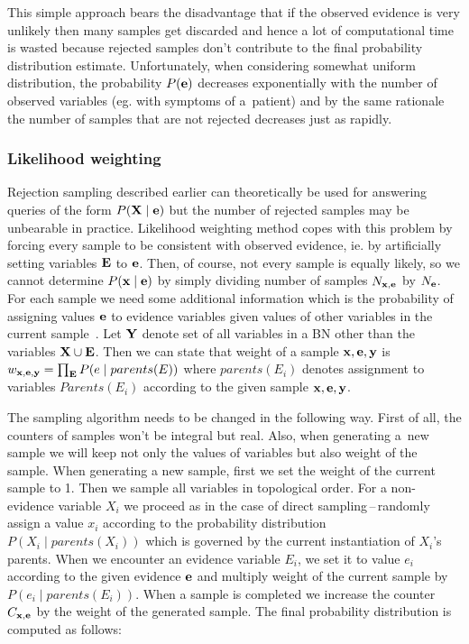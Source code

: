\documentclass[english,cover]{fitthesis} %
\newcommand{\vars}[1]{{\bold{#1}}}         %
\begin{document}
This simple approach bears the disadvantage that if the observed evidence is very unlikely then many samples get discarded and hence a lot of computational time is wasted because rejected samples don't contribute to the final probability distribution estimate. Unfortunately, when considering somewhat uniform distribution, the probability $P(\vars{e})$ decreases exponentially with the number of observed variables (eg. with symptoms of a~patient) and by the same rationale the number of samples that are not rejected decreases just as rapidly.

\subsubsection{Likelihood weighting}
Rejection sampling described earlier can theoretically be used for answering queries of the form $P(\vars{X} \mid \vars{e})$ but the number of rejected samples may be unbearable in practice. Likelihood weighting method copes with this problem by forcing every sample to be consistent with observed evidence, ie. by artificially setting variables $\vars{E}$ to $\vars{e}$. Then, of course, not every sample is equally likely, so we cannot determine $P(\vars{x} \mid \vars{e})$ by simply dividing number of samples $N_{\vars{x},\vars{e}}$ by $N_\vars{e}$. For each sample we need some additional information which is the probability of assigning values $\vars{e}$ to evidence variables given values of other variables in the current sample~\cite[p.~514]{russell_norvig_ed2}. Let $\vars{Y}$ denote set of all variables in a BN other than the variables $\vars{X} \cup \vars{E}$. Then we can state that weight of a sample $\vars{x},\vars{e}, \vars{y}$ is $w_{\vars{x},\vars{e}, \vars{y}} = \prod_\vars{E} P(e \mid parents(E))$ where $parents(E_i)$ denotes assignment to variables $Parents(E_i)$ according to the given sample $\vars{x},\vars{e}, \vars{y}$.

The sampling algorithm needs to be changed in the following way. First of all, the counters of samples won't be integral but real. Also, when generating a~new sample we will keep not only the values of variables but also weight of the sample. When generating a new sample, first we set the weight of the current sample to 1. Then we sample all variables in topological order. For a non-evidence variable $X_i$ we proceed as in the case of direct sampling\,--\,randomly assign a value $x_i$ according to the probability distribution $P(X_i \mid parents(X_i))$ which is governed by the current instantiation of $X_i$'s parents. When we encounter an evidence variable $E_i$, we set it to value $e_i$ according to the given evidence $\vars{e}$ and multiply weight of the current sample by $P(e_i \mid parents(E_i))$. When a sample is completed we increase the counter $C_{\vars{x},\vars{e}}$ by the weight of the generated sample. The final probability distribution is computed as follows:
\end{document}
